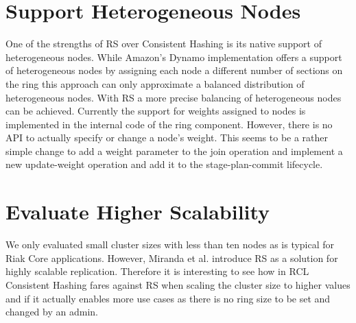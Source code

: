 \section{Support Heterogeneous Nodes}
One of the strengths of \ac{RS} over Consistent Hashing is its native support of heterogeneous nodes.
While Amazon's Dynamo implementation\cite{DeCandia2007} offers a support of heterogeneous nodes by assigning each node a different number of sections on the ring this approach can only approximate a balanced distribution of heterogeneous nodes.
With \ac{RS} a more precise balancing of heterogeneous nodes can be achieved.
Currently the support for weights assigned to nodes is implemented in the internal code of the ring component.
However, there is no API to actually specify or change a node's weight.
This seems to be a rather simple change to add a weight parameter to the join operation and implement a new update-weight operation and add it to the stage-plan-commit lifecycle.


\section{Evaluate Higher Scalability}
We only evaluated small cluster sizes with less than ten nodes as is typical for Riak Core applications.
However, Miranda et al. introduce \ac{RS} as a solution for highly scalable replication\cite{Miranda2014}.
Therefore it is interesting to see how in \ac{RCL} Consistent Hashing fares against \ac{RS} when scaling the cluster size to higher values and if it actually enables more use cases as there is no ring size to be set and changed by an admin.